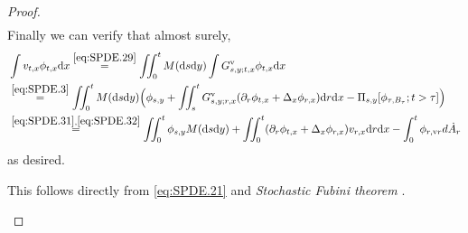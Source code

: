 \documentclass[12pt,a4paper]{amsart}
\numberwithin{equation}{section}
\theoremstyle{plain}
\theoremstyle{remark}
\newenvironment{proof*}[1][\proofname]{
	\renewcommand\qedsymbol{\rule{3mm}{3mm}}
	\begin{proof}[#1]}{\end{proof}}
\begin{document}
\begin{proof}
\begin{align}
\end{align}
	Finally we can verify that almost surely, 
\begin{align} 
&  \int v_{t,x} \phi_{t,x} \mathrm dx 
\overset{\eqref{eq:SPDE.29}}=   \iint_0^t M(\mathrm ds\mathrm dy) \int G^\mathrm v_{s,y;t,x} \phi_{t,x} \mathrm dx 
\\ &\overset{\eqref{eq:SPDE.3}}=   \iint_0^t M(\mathrm ds\mathrm dy) \Big(\phi_{s,y} + \iint_s^t G_{s,y;r,x}^\mathrm v (\partial_r\phi_{t,x}+\Delta_x\phi_{r,x}) \mathrm dr\mathrm dx - \Pi_{s,y}[\phi_{\tau, B_\tau}; t>\tau]\Big) 
\\ &\overset{\eqref{eq:SPDE.31}, \eqref{eq:SPDE.32}}= \iint_0^t \phi_{s,y}M(\mathrm ds\mathrm dy) + \iint_0^t  (\partial_r\phi_{t,x}+\Delta_x\phi_{r,x}) v_{r,x} \mathrm dr\mathrm dx - \int_0^t \phi_{r,\mathrm vr}d \dot A_r
\end{align}
as desired.

\begin{proof*}
	This follows directly from \eqref{eq:SPDE.21} and \emph{Stochastic Fubini theorem} \cite[Theorem 7.24]{Li2010Measure-valued}.
\end{proof*}


\end{proof}
\end{document}
